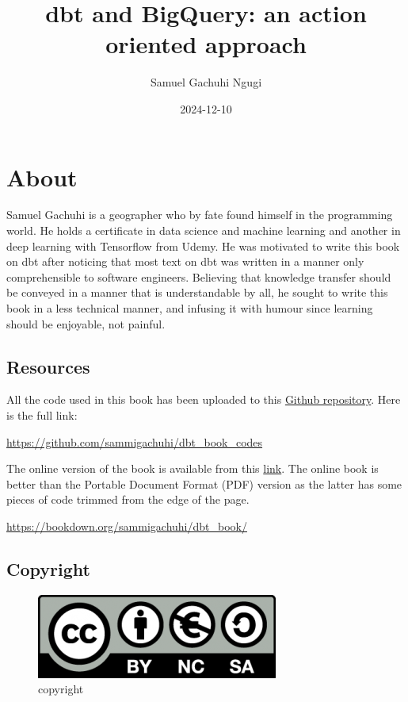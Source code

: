 \documentclass[
]{book}
\title{dbt and BigQuery: an action oriented approach}
\author{Samuel Gachuhi Ngugi}
\date{2024-12-10}
\begin{document}
\maketitle

{
\setcounter{tocdepth}{1}
\tableofcontents
}
\hypertarget{about}{%
\chapter{About}\label{about}}

Samuel Gachuhi is a geographer who by fate found himself in the programming world. He holds a certificate in data science and machine learning and another in deep learning with Tensorflow from Udemy. He was motivated to write this book on dbt after noticing that most text on dbt was written in a manner only comprehensible to software engineers. Believing that knowledge transfer should be conveyed in a manner that is understandable by all, he sought to write this book in a less technical manner, and infusing it with humour since learning should be enjoyable, not painful.

\hypertarget{resources}{%
\section{Resources}\label{resources}}

All the code used in this book has been uploaded to this \href{https://github.com/sammigachuhi/dbt_book_codes}{Github repository}. Here is the full link:

\url{https://github.com/sammigachuhi/dbt_book_codes}

The online version of the book is available from this \href{https://bookdown.org/sammigachuhi/dbt_book/}{link}. The online book is better than the Portable Document Format (PDF) version as the latter has some pieces of code trimmed from the edge of the page.

\url{https://bookdown.org/sammigachuhi/dbt_book/}

\hypertarget{copyright}{%
\section{Copyright}\label{copyright}}

\begin{figure}
\centering
\includegraphics{./images/copyright.png}
\caption{copyright}
\end{figure}
\end{document}
